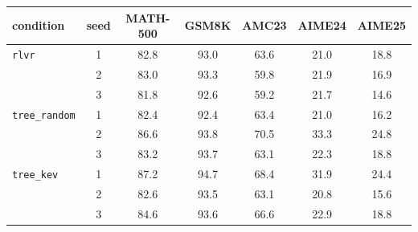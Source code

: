 \begin{tabular}{@{}lcccccc@{}}
\toprule
condition & seed & MATH-500 & GSM8K & AMC23 & AIME24 & AIME25 \\ \midrule
\texttt{rlvr} & 1 & 82.8 & 93.0 & 63.6 & 21.0 & 18.8 \\
 & 2 & 83.0 & 93.3 & 59.8 & 21.9 & 16.9 \\
 & 3 & 81.8 & 92.6 & 59.2 & 21.7 & 14.6 \\
\addlinespace
\texttt{tree\_random} & 1 & 82.4 & 92.4 & 63.4 & 21.0 & 16.2 \\
 & 2 & 86.6 & 93.8 & 70.5 & 33.3 & 24.8 \\
 & 3 & 83.2 & 93.7 & 63.1 & 22.3 & 18.8 \\
\addlinespace
\texttt{tree\_kev} & 1 & 87.2 & 94.7 & 68.4 & 31.9 & 24.4 \\
 & 2 & 82.6 & 93.5 & 63.1 & 20.8 & 15.6 \\
 & 3 & 84.6 & 93.6 & 66.6 & 22.9 & 18.8 \\
\bottomrule
\end{tabular}

